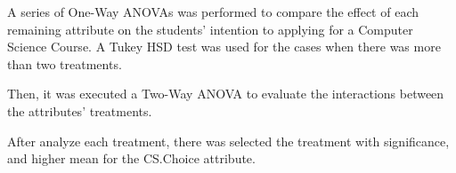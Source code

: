A series of One-Way ANOVAs was performed to compare the effect of each remaining attribute on the students' intention to applying for a Computer Science Course. A Tukey HSD test was used for the cases when there was more than two treatments.
 
Then, it was executed a Two-Way ANOVA to evaluate the interactions between the attributes' treatments.

After analyze each treatment, there was selected the treatment with significance, and higher mean for the CS.Choice attribute.



